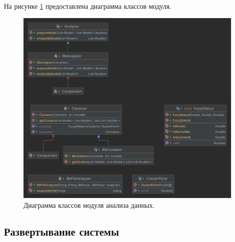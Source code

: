 

На рисунке \ref{fig:analyzerUml} предоставлена диаграмма классов модуля.

\begin{figure}[H]
	\centering
	\includegraphics[width=\textwidth]{img/analyze.pdf}
	\caption{Диаграмма классов модуля анализа данных.}
	\label{fig:analyzerUml}
\end{figure}

\subsection{Развертывание системы}

